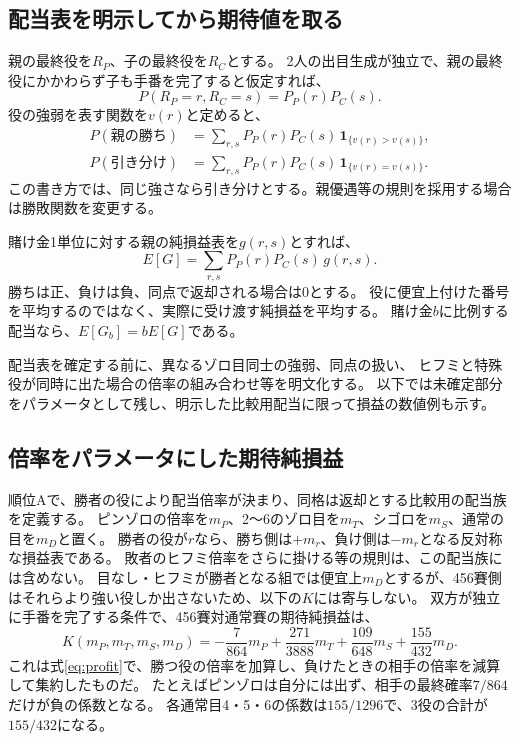 \documentclass[11pt,a4paper]{article}
\numberwithin{equation}{section}
\begin{document}
\subsection{配当表を明示してから期待値を取る}
親の最終役を$R_P$、子の最終役を$R_C$とする。
2人の出目生成が独立で、親の最終役にかかわらず子も手番を完了すると仮定すれば、
\[
P(R_P=r,R_C=s)=P_P(r)P_C(s).
\]
役の強弱を表す関数を$v(r)$と定めると、
\begin{align}
P(\text{親の勝ち})&=\sum_{r,s}P_P(r)P_C(s)\,
                         \mathbf{1}_{\{v(r)>v(s)\}},\\
P(\text{引き分け})&=\sum_{r,s}P_P(r)P_C(s)\,
                         \mathbf{1}_{\{v(r)=v(s)\}}.
\end{align}
この書き方では、同じ強さなら引き分けとする。親優遇等の規則を採用する場合は勝敗関数を変更する。

賭け金1単位に対する親の純損益表を$g(r,s)$とすれば、
\begin{equation}
\boxed{
E[G]=\sum_{r,s}P_P(r)P_C(s)\,g(r,s)
}.
\label{eq:profit}
\end{equation}
勝ちは正、負けは負、同点で返却される場合は0とする。
役に便宜上付けた番号を平均するのではなく、実際に受け渡す純損益を平均する。
賭け金$b$に比例する配当なら、$E[G_b]=bE[G]$である。

配当表を確定する前に、異なるゾロ目同士の強弱、同点の扱い、
ヒフミと特殊役が同時に出た場合の倍率の組み合わせ等を明文化する。
以下では未確定部分をパラメータとして残し、明示した比較用配当に限って損益の数値例も示す。

\subsection{倍率をパラメータにした期待純損益}
順位Aで、勝者の役により配当倍率が決まり、同格は返却とする比較用の配当族を定義する。
ピンゾロの倍率を$m_P$、2〜6のゾロ目を$m_T$、シゴロを$m_S$、通常の目を$m_D$と置く。
勝者の役が$r$なら、勝ち側は$+m_r$、負け側は$-m_r$となる反対称な損益表である。
敗者のヒフミ倍率をさらに掛ける等の規則は、この配当族には含めない。
目なし・ヒフミが勝者となる組では便宜上$m_D$とするが、456賽側はそれらより強い役しか出さないため、以下の$K$には寄与しない。
双方が独立に手番を完了する条件で、456賽対通常賽の期待純損益は、
\begin{equation}
\boxed{K(m_P,m_T,m_S,m_D)
=-\frac7{864}m_P+\frac{271}{3888}m_T
+\frac{109}{648}m_S+\frac{155}{432}m_D.}
\label{eq:param-payoff}
\end{equation}
これは式\eqref{eq:profit}で、勝つ役の倍率を加算し、負けたときの相手の倍率を減算して集約したものだ。
たとえばピンゾロは自分には出ず、相手の最終確率$7/864$だけが負の係数となる。
各通常目4・5・6の係数は$155/1296$で、3役の合計が$155/432$になる。
\end{document}
